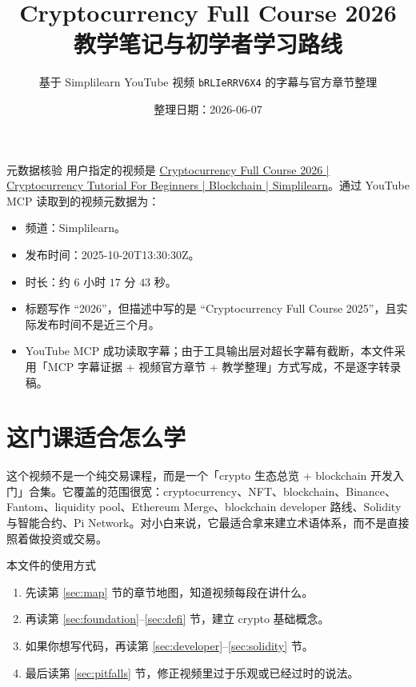 \documentclass[UTF8,11pt]{ctexart}
\title{\sffamily\bfseries Cryptocurrency Full Course 2026\\教学笔记与初学者学习路线}
\author{基于 Simplilearn YouTube 视频 \texttt{bRLIeRRV6X4} 的字幕与官方章节整理}
\date{整理日期：2026-06-07}
\begin{document}
\maketitle

\begin{warnbox}{元数据核验}
用户指定的视频是 \href{https://www.youtube.com/watch?v=bRLIeRRV6X4}{Cryptocurrency Full Course 2026 | Cryptocurrency Tutorial For Beginners | Blockchain | Simplilearn}。通过 YouTube MCP 读取到的视频元数据为：
\begin{itemize}
  \item 频道：Simplilearn。
  \item 发布时间：2025-10-20T13:30:30Z。
  \item 时长：约 \(6\) 小时 \(17\) 分 \(43\) 秒。
  \item 标题写作 ``2026''，但描述中写的是 ``Cryptocurrency Full Course 2025''，且实际发布时间不是近三个月。
  \item YouTube MCP 成功读取字幕；由于工具输出层对超长字幕有截断，本文件采用「MCP 字幕证据 + 视频官方章节 + 教学整理」方式写成，不是逐字转录稿。
\end{itemize}
\end{warnbox}

\tableofcontents
\newpage

\section{这门课适合怎么学}

这个视频不是一个纯交易课程，而是一个「crypto 生态总览 + blockchain 开发入门」合集。它覆盖的范围很宽：cryptocurrency、NFT、blockchain、Binance、Fantom、liquidity pool、Ethereum Merge、blockchain developer 路线、Solidity 与智能合约、Pi Network。对小白来说，它最适合拿来建立术语体系，而不是直接照着做投资或交易。

\begin{keybox}{本文件的使用方式}
\begin{enumerate}
  \item 先读第 \ref{sec:map} 节的章节地图，知道视频每段在讲什么。
  \item 再读第 \ref{sec:foundation}--\ref{sec:defi} 节，建立 crypto 基础概念。
  \item 如果你想写代码，再读第 \ref{sec:developer}--\ref{sec:solidity} 节。
  \item 最后读第 \ref{sec:pitfalls} 节，修正视频里过于乐观或已经过时的说法。
\end{enumerate}
\end{keybox}
\end{document}
